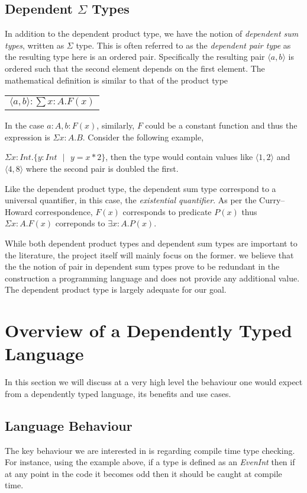 \documentclass[a4paper,12pt]{report}
\begin{document}
\subsection{Dependent $\Sigma$ Types}
In addition to the dependent product type, we have the notion of \textit{dependent sum 
types}, written as $\Sigma$ type. This is often referred to as the 
\textit{dependent pair type} as the resulting type here is an ordered pair. 
Specifically the resulting pair $\langle a,b \rangle$ is ordered such that the 
second element depends on the first element. The 
mathematical definition is similar to that of the product type
\begin{center}
 \begin{tabular}{l}
   $\langle a,b \rangle :\sum x: A.  F(x)$
 \end{tabular} 
\end{center}
In the case $a:A, b: F(x)$, similarly, $F$ could be a constant function and thus 
the expression is $\Sigma x:A.B$. Consider the following example, 

$\Sigma x: Int.\{y:Int\text{ }|\text{ } y = x * 2\}$, then the type would 
contain values like $\langle 1,2 \rangle$ and $\langle 4,8 \rangle$ where the 
second pair is doubled the first.

\par
Like the dependent product type, the dependent sum type correspond to a 
universal quantifier, in this case, the \textit{existential quantifier}. As 
per the Curry–Howard correspondence, $F(x)$ corresponds to predicate $P(x)$ 
thus $\Sigma x:A.F(x)$ correponds to $\exists x: A. P(x)$.

\par
While both dependent product types and dependent sum types are important to the 
literature, the project itself will mainly focus on the former. we believe that 
the the notion of pair in dependent sum types prove to be redundant in 
the construction a programming language and does not provide any additional 
value. The dependent product type is largely adequate for our goal.

\section{Overview of a Dependently Typed Language}
In this section we will discuss at a very high level the behaviour one would 
expect from a dependently typed language, its benefits and use cases.

\subsection{Language Behaviour}
The key behaviour we are interested in is regarding compile time type checking. 
For instance, using the example above, if a type is defined as an \textit{EvenInt} 
then if at any point in the code it becomes odd then it should be caught at 
compile time. 
\end{document}
